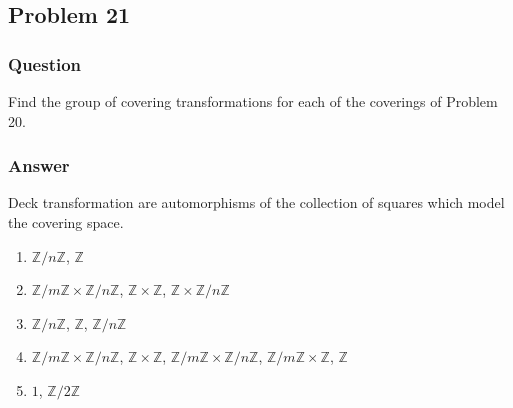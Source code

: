 \documentclass[10pt]{article}
\begin{document}
\subsection{Problem 21}
\subsubsection{Question}
Find the group of covering transformations for each of the coverings of Problem 20.
\subsubsection{Answer}
Deck transformation are automorphisms of the collection of squares which model the covering space.
\begin{enumerate}
\item $\mathbb{Z} / n \mathbb{Z}$, $\mathbb{Z}$
\item $\mathbb{Z} / m \mathbb{Z} \times \mathbb{Z} / n \mathbb{Z}$, $\mathbb{Z} \times \mathbb{Z}$, $\mathbb{Z} \times \mathbb{Z} / n \mathbb{Z}$
\item $\mathbb{Z} / n \mathbb{Z}$, $\mathbb{Z}$, $\mathbb{Z} / n \mathbb{Z}$
\item $\mathbb{Z} / m \mathbb{Z} \times \mathbb{Z} / n \mathbb{Z}$, $\mathbb{Z}  \times \mathbb{Z} $, $\mathbb{Z} / m \mathbb{Z} \times \mathbb{Z} / n \mathbb{Z}$,  $\mathbb{Z} / m \mathbb{Z} \times \mathbb{Z}$, $\mathbb{Z} $
\item $1$, $\mathbb{Z} / 2 \mathbb{Z}$
\end{enumerate}
\end{document}
